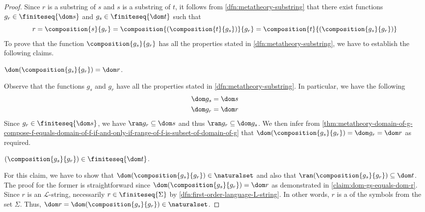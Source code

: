 \begin{proof}
    Since \( r \) is a substring of \( s \) and \( s \) is a substring of \( t \), it follows from \cref{dfn:metatheory-substring} that
    there exist functions \( g_{r} \in \finiteseq{ \dom s } \) and \( g_{s} \in \finiteseq{\dom t} \) such that
    \begin{equation*}
        r = \composition{s}{g_{r}} = \composition{\mleft( \composition{t}{g_{s}} \mright)}{g_{r}} =
    \composition{t}{\mleft( \composition{g_{s}}{g_{r}} \mright)}
    \end{equation*}
    To prove that the function \( \composition{g_{s}}{g_{r}} \) has all the properties stated in \cref{dfn:metatheory-substring}, we have to establish
    the following claims.
    \begin{claim}
         \label{claim:dom-gs-equals-dom-r}
        \( \dom \mleft( \composition{g_{s}}{g_{r}} \mright) = \dom r \).
    \end{claim}

    \noindent
    Observe that the functions \( g_{s} \) and \( g_{r} \) have all the properties stated in \cref{dfn:metatheory-substring}.
    In particular, we have the following
    \begin{align*}
        \dom g_{s} &= \dom s \\
        \dom g_{r} &= \dom r
    \end{align*}
    Since \( g_{r} \in \finiteseq{\dom s} \), we have \( \ran g_{r} \subseteq \dom s \)
    and thus \( \ran g_{r} \subseteq \dom g_{s} \).
    We then infer from \cref{thm:metatheory-domain-of-g-compose-f-equals-domain-of-f-if-and-only-if-range-of-f-is-subset-of-domain-of-g}
    that \( \dom \mleft( \composition{g_{s}}{g_{r}} \mright) = \dom g_{r} = \dom r \) as required.

    \begin{claim}
         \label{claim:gs-compose-gr-is-an-element-of-Seq-dom-t}
        \( \mleft( \composition{g_{s}}{g_{r}} \mright) \in \finiteseq{\dom t} \).
    \end{claim}
    \noindent
    For this claim, we have to show that \( \dom \mleft( \composition{g_{s}}{g_{r}} \mright) \in \naturalset \) and also that
    \( \ran \mleft( \composition{g_{s}}{g_{r}} \mright) \subseteq \dom t \).
    The proof for the former is straightforward since \( \dom \mleft( \composition{g_{s}}{g_{r}} \mright) = \dom r \) as demonstrated
    in \cref{claim:dom-gs-equals-dom-r}. Since \( r \) is an \( \mathcal{L} \)-string, necessarily \( r \in \finiteseq{\Sigma} \) by \cref{dfn:first-order-language-L-string}.
    In other words, \( r \) is a  of the symbols from the set \( \Sigma \).
    Thus, \( \dom r = \dom \mleft( \composition{g_{s}}{g_{r}} \mright) \in \naturalset \).


\end{proof}
